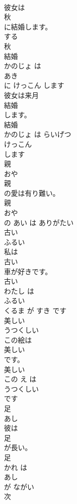 \documentclass[8pt]{extreport}
\begin{document}
\begin{CJK}{UTF8}{min}
\\	彼女は
\\	秋
\\	に結婚します。	
\\	する 
\\	秋 
\\	結婚 
\\	かのじょ は 
\\	あき
\\	に けっこん します	
\\	彼女は来月
\\	結婚
\\	します。	
\\	結婚 
\\	かのじょ は らいげつ 
\\	けっこん
\\	します	
\\	親	
\\	おや	
\\	親
\\	の愛は有り難い。	
\\	親 
\\	おや
\\	の あい は ありがたい	
\\	古い	
\\	ふるい	
\\	私は
\\	古い
\\	車が好きです。	
\\	古い 
\\	わたし は 
\\	ふるい
\\	くるま が すき です	
\\	美しい	
\\	うつくしい	
\\	この絵は
\\	美しい
\\	です。	
\\	美しい 
\\	この え は 
\\	うつくしい
\\	です	
\\	足	
\\	あし	
\\	彼は
\\	足
\\	が長い。	
\\	足 
\\	かれ は 
\\	あし
\\	が ながい	
\\	次	

\end{CJK}
\end{document}
